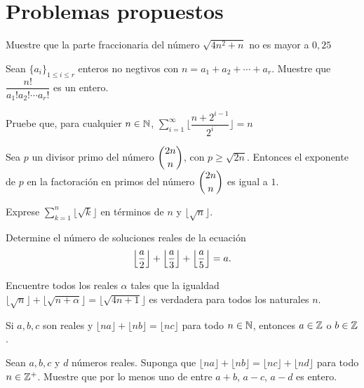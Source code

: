 \section*{Problemas propuestos}
\begin{pbm}
	Muestre que la parte fraccionaria del n\'umero $\sqrt{4n^{2} + n}$ no es mayor a $0,25$
\end{pbm}
\begin{pbm}
	Sean $\{a_{i}\}_{1 \leq i \leq r}$ enteros no negtivos con $n = a_{1} + a_{2} + \cdots + a_{r}$. Muestre que $\dfrac{n!}{a_{1}!a_{2}!\cdots a_{r}!}$ es un entero.
\end{pbm}
\begin{pbm}
	Pruebe que, para cualquier $n \in \mathbb{N}$, $\displaystyle\sum_{i=1}^{\infty}\biggl\lfloor \dfrac{n + 2^{i-1}}{2^{i}} \biggr\rfloor = n$
\end{pbm}
\begin{pbm}
	Sea $p$ un divisor primo del n\'umero $\dbinom{2n}{n}$, con $p \geq \sqrt{2n}$. Entonces el exponente de $p$ en la factoraci\'on en primos del n\'umero $\dbinom{2n}{n}$ es igual a $1$. 
\end{pbm}
\begin{pbm}[Corea 1997]
	Exprese $\displaystyle\sum_{k = 1}^{n}\lfloor \sqrt{k} \rfloor$ en t\'erminos de $n$ y $\lfloor \sqrt{n} \rfloor$.
\end{pbm}
\begin{pbm}[Canad\'a 1998]
	Determine el n\'umero de soluciones reales de la ecuaci\'on 
	$$\Bigl\lfloor \frac{a}{2} \Bigr\rfloor + \Bigl\lfloor \frac{a}{3} \Bigr\rfloor + \Bigl\lfloor \frac{a}{5} \Bigr\rfloor = a.$$
\end{pbm}
\begin{pbm}
	Encuentre todos los reales $\alpha$ tales que la igualdad\\
	$\lfloor \sqrt{n} \rfloor + \lfloor \sqrt{n + \alpha} \rfloor = \lfloor \sqrt{4n + 1} \rfloor$ es verdadera para todos los naturales $n$.
\end{pbm}
\begin{pbm}
	Si $a,b,c$ son reales y $\lfloor na \rfloor + \lfloor nb \rfloor = \lfloor nc \rfloor$ para todo $n \in \mathbb{N}$, entonces $a \in \mathbb{Z}$ o $b \in \mathbb{Z}$.
\end{pbm}
\begin{pbm}
	Sean $a,b,c$ y $d$ n\'umeros reales. Suponga que $\lfloor na \rfloor + \lfloor nb \rfloor = \lfloor nc \rfloor + \lfloor nd \rfloor$ para todo $n \in \mathbb{Z}^{+}$. Muestre que por lo menos uno de entre $a + b$, $a - c$, $a - d$ es entero. 
\end{pbm}
